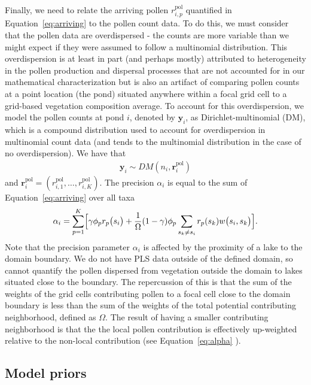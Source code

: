 \documentclass[12pt]{article}
\begin{document}
Finally, we need to relate the arriving pollen $r_{i,p}^{\text{pol}}$
quantified in Equation~\ref{eq:arriving} to the pollen count data. To
do this, we must consider that the pollen data are overdispersed - the
counts are more variable than we might expect if they were assumed to
follow a multinomial distribution. This overdispersion is at least in
part (and perhaps mostly) attributed to heterogeneity in the pollen
production and dispersal processes that are not accounted for in our
mathematical characterization but is also an artifact of comparing
pollen counts at a point location (the pond) situated anywhere within
a focal grid cell to a grid-based vegetation composition average. To
account for this overdispersion, we model the pollen counts at pond
$i$, denoted by $\bm{y}_i$, as Dirichlet-multinomial (DM), which is a
compound distribution used to account for overdispersion in
multinomial count data (and tends to the multinomial distribution in
the case of no overdispersion). We have that
\begin{align}
\bm{y}_i \sim DM (n_i, \bm{r}_i^{\text{pol}})
\label{eq:DM}
\end{align}
and $\bm{r}_i^{\text{pol}} = (r_{i,1}^{\text{pol}}, \ldots,
r_{i,K}^{\text{pol}})$.  The precision $\alpha_i$ is equal to the sum
of Equation~\ref{eq:arriving} over all taxa
\begin{align}
\alpha_i = \sum_{p=1}^K \Bigl[\gamma \phi_p r_p\bigl(s_i\bigr) + \frac{1}{\Omega} (1-\gamma) \phi_p \sum_{s_k \neq s_i } r_p(s_k) w\bigl(s_i, s_k\bigr)\Bigr].
\label{eq:alpha}
\end{align}
Note that the precision parameter $\alpha_i$ is affected by the
proximity of a lake to the domain boundary. We do not have PLS data
outside of the defined domain, so cannot quantify the pollen dispersed
from vegetation outside the domain to lakes situated close to the
boundary. The repercussion of this is that the sum of the weights of
the grid cells contributing pollen to a focal cell close to the domain
boundary is less than the sum of the weights of the total potential
contributing neighborhood, defined as $\Omega$. The result of having a
smaller contributing neighborhood is that the the local pollen
contribution is effectively up-weighted relative to the non-local
contribution (see Equation~\ref{eq:alpha} ).

\subsection{Model priors}
\end{document}
